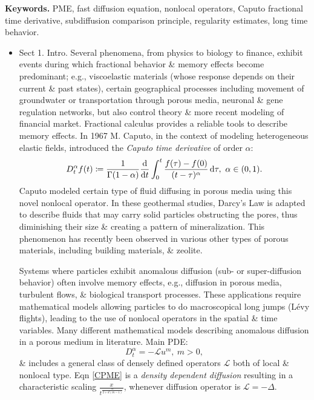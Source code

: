\documentclass{article}
\begin{document}
\begin{enumerate}
	{\bf Keywords.} PME, fast diffusion equation, nonlocal operators, Caputo fractional time derivative, subdiffusion comparison principle, regularity estimates, long time behavior.
	\begin{itemize}
		\item {\sf Sect 1. Intro.} Several phenomena, from physics to biology to finance, exhibit events during which fractional behavior \& memory effects become predominant; e.g., viscoelastic materials (whose response depends on their current \& past states), certain geographical processes including movement of groundwater or transportation through porous media, neuronal \& gene regulation networks, but also control theory \& more recent modeling of financial market. Fractional calculus provides a reliable tools to describe memory effects. In 1967 M. Caputo, in the context of modeling heterogeneous elastic fields, introduced the {\it Caputo time derivative} of order $\alpha$:
		\begin{equation}
			\label{Caputo time fractional derivative}
			D_t^\alpha f(t)\coloneqq\frac{1}{\Gamma(1 - \alpha)}\frac{\rm d}{{\rm d}t}\int_0^t \frac{f(\tau) - f(0)}{(t - \tau)^\alpha}\,{\rm d}\tau,\ \alpha\in(0,1).
		\end{equation}
		Caputo modeled certain type of fluid diffusing in porous media using this novel nonlocal operator. In these geothermal studies, Darcy's Law is adapted to describe fluids that may carry solid particles obstructing the pores, thus diminishing their size \& creating a pattern of mineralization. This phenomenon has recently been observed in various other types of porous materials, including building materials, \& zeolite.
		
		Systems where particles exhibit anomalous diffusion (sub- or super-diffusion behavior) often involve memory effects, e.g., diffusion in porous media, turbulent flows, \& biological transport processes. These applications require mathematical models allowing particles to do macroscopical long jumps (L\'evy flights), leading to the use of nonlocal operators in the spatial \& time variables. Many different mathematical models describing anomalous diffusion in a porous medium in literature. Main PDE:
		\begin{equation}
			\label{CPME}
			\tag{CPME}
			D_t^\alpha = -\mathcal{L}u^m,\ m > 0,
		\end{equation}
		\& includes a general class of densely defined operators $\mathcal{L}$ both of local \& nonlocal type. Eqn \eqref{CPME} is a {\it density dependent diffusion} resulting in a characteristic scaling $\frac{x}{t^{\frac{\alpha}{2 + d(m - 1)}}}$, whenever diffusion operator is $\mathcal{L} = -\Delta$.
		

\end{itemize}
\end{enumerate}
\end{document}

